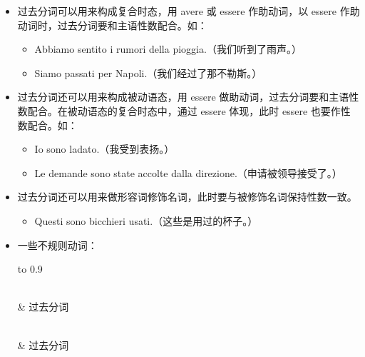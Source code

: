 \documentclass[UTF8,a4paper,titlepage,10pt]{report}
\begin{document}
\begin{enumerate}
\begin{itemize}
\item 过去分词可以用来构成复合时态，用 avere 或 essere 作助动词，以 essere 作助动词时，过去分词要和主语性数配合。如：
\begin{itemize}
\item Abbiamo sentito i rumori della pioggia.（我们听到了雨声。）
\item Siamo passati per Napoli.（我们经过了那不勒斯。）
\end{itemize}
\item 过去分词还可以用来构成被动语态，用 essere 做助动词，过去分词要和主语性数配合。在被动语态的复合时态中，通过 essere 体现，此时 essere 也要作性数配合。如：
\begin{itemize}
\item Io sono ladato.（我受到表扬。）
\item Le demande sono state accolte dalla direzione.（申请被领导接受了。）
\end{itemize}
\item 过去分词还可以用来做形容词修饰名词，此时要与被修饰名词保持性数一致。
\begin{itemize}
\item Questi sono bicchieri usati.（这些是用过的杯子。）
\end{itemize}
\item 一些不规则动词：
\begin{longtabu} to 0.9\textwidth {l|X}
\caption{意大利语过去分词不规则动词变位表}
\\
\toprule
 & 过去分词\\
\midrule
\endfirsthead
{} \\
\toprule

 & 过去分词 \\


\end{longtabu}
\end{itemize}
\end{enumerate}
\end{document}
